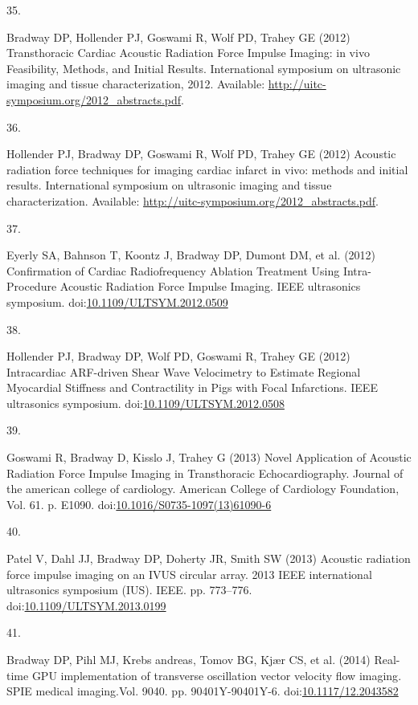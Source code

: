 \documentclass[
]{article}
\newlength{\cslhangindent}
\newlength{\csllabelwidth}
\newenvironment{CSLReferences}[2] %
 {\begin{list}{}{%
  \setlength{\itemindent}{0pt}
  \setlength{\leftmargin}{0pt}
  \setlength{\parsep}{0pt}
  \ifodd #1
   \setlength{\leftmargin}{\cslhangindent}
   \setlength{\itemindent}{-1\cslhangindent}
  \fi
  \setlength{\itemsep}{#2\baselineskip}}}
 {\end{list}}
\newcommand{\CSLLeftMargin}[1]{\parbox[t]{\csllabelwidth}{\strut#1\strut}}
\newcommand{\CSLRightInline}[1]{\parbox[t]{\linewidth - \csllabelwidth}{\strut#1\strut}}
\begin{document}
\begin{CSLReferences}{0}{1}
\CSLLeftMargin{35. }%
\CSLRightInline{Bradway DP, Hollender PJ, Goswami R, Wolf PD, Trahey GE
(2012) {Transthoracic Cardiac Acoustic Radiation Force Impulse Imaging:
in vivo Feasibility, Methods, and Initial Results}. International
symposium on ultrasonic imaging and tissue characterization, 2012.
Available: \url{http://uitc-symposium.org/2012_abstracts.pdf}.}

\CSLLeftMargin{36. }%
\CSLRightInline{Hollender PJ, Bradway DP, Goswami R, Wolf PD, Trahey GE
(2012) {Acoustic radiation force techniques for imaging cardiac infarct
in vivo: methods and initial results}. International symposium on
ultrasonic imaging and tissue characterization. Available:
\url{http://uitc-symposium.org/2012_abstracts.pdf}.}

\CSLLeftMargin{37. }%
\CSLRightInline{Eyerly SA, Bahnson T, Koontz J, Bradway DP, Dumont DM,
et al. (2012) {Confirmation of Cardiac Radiofrequency Ablation Treatment
Using Intra-Procedure Acoustic Radiation Force Impulse Imaging}. IEEE
ultrasonics symposium.
doi:\href{https://doi.org/10.1109/ULTSYM.2012.0509}{10.1109/ULTSYM.2012.0509}}

\CSLLeftMargin{38. }%
\CSLRightInline{Hollender PJ, Bradway DP, Wolf PD, Goswami R, Trahey GE
(2012) {Intracardiac ARF-driven Shear Wave Velocimetry to Estimate
Regional Myocardial Stiffness and Contractility in Pigs with Focal
Infarctions}. IEEE ultrasonics symposium.
doi:\href{https://doi.org/10.1109/ULTSYM.2012.0508}{10.1109/ULTSYM.2012.0508}}

\CSLLeftMargin{39. }%
\CSLRightInline{Goswami R, Bradway D, Kisslo J, Trahey G (2013) {Novel
Application of Acoustic Radiation Force Impulse Imaging in Transthoracic
Echocardiography}. Journal of the american college of cardiology.
American College of Cardiology Foundation, Vol. 61. p. E1090.
doi:\href{https://doi.org/10.1016/S0735-1097(13)61090-6}{10.1016/S0735-1097(13)61090-6}}

\CSLLeftMargin{40. }%
\CSLRightInline{Patel V, Dahl JJ, Bradway DP, Doherty JR, Smith SW
(2013) {Acoustic radiation force impulse imaging on an IVUS circular
array}. 2013 IEEE international ultrasonics symposium (IUS). IEEE. pp.
773--776.
doi:\href{https://doi.org/10.1109/ULTSYM.2013.0199}{10.1109/ULTSYM.2013.0199}}

\CSLLeftMargin{41. }%
\CSLRightInline{Bradway DP, Pihl MJ, Krebs andreas, Tomov BG, Kjær CS,
et al. (2014) {Real-time GPU implementation of transverse oscillation
vector velocity flow imaging}. SPIE medical imaging.Vol. 9040. pp.
90401Y-90401Y-6.
doi:\href{https://doi.org/10.1117/12.2043582}{10.1117/12.2043582}}


\end{CSLReferences}
\end{document}

